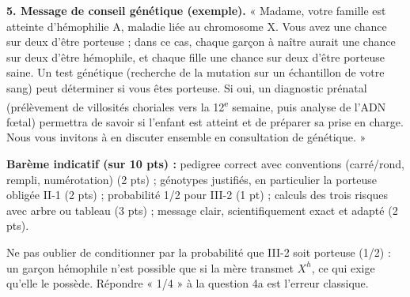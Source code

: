 \documentclass[11pt]{article}
\begin{document}
\begin{corrige}
\textbf{5. Message de conseil génétique (exemple).}
« Madame, votre famille est atteinte d'hémophilie A, maladie liée au chromosome X. Vous avez une chance sur deux d'être porteuse ; dans ce cas, chaque garçon à naître aurait une chance sur deux d'être hémophile, et chaque fille une chance sur deux d'être porteuse saine. Un test génétique (recherche de la mutation sur un échantillon de votre sang) peut déterminer si vous êtes porteuse. Si oui, un diagnostic prénatal (prélèvement de villosités choriales vers la 12\textsuperscript{e} semaine, puis analyse de l'ADN fœtal) permettra de savoir si l'enfant est atteint et de préparer sa prise en charge. Nous vous invitons à en discuter ensemble en consultation de génétique. »

\textbf{Barème indicatif (sur 10 pts) :} pedigree correct avec conventions (carré/rond, rempli, numérotation) (2 pts) ; génotypes justifiés, en particulier la porteuse obligée II-1 (2 pts) ; probabilité 1/2 pour III-2 (1 pt) ; calculs des trois risques avec arbre ou tableau (3 pts) ; message clair, scientifiquement exact et adapté (2 pts).

\begin{attention}
Ne pas oublier de conditionner par la probabilité que III-2 soit porteuse (1/2) : un garçon hémophile n'est possible que si la mère transmet $X^h$, ce qui exige qu'elle le possède. Répondre « 1/4 » à la question 4a est l'erreur classique.
\end{attention}
\end{corrige}
\end{document}

